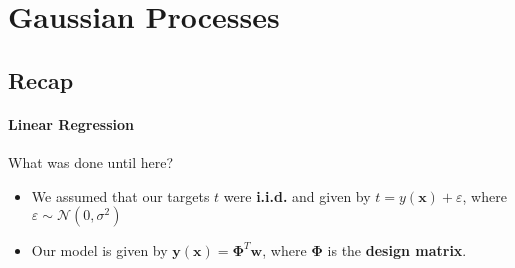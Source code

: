 \section{Gaussian Processes}
\framecard{\insertsection}

\subsection{Recap}
\begin{frame}{\insertsubsection}
    \framesubtitle{Linear Regression} 

    What was done until here?
    \begin{itemize}
        \item We assumed that our targets $t$ were \textcolor{UniOrange}{\textbf{i.i.d.}} and given by $t = y(\mathbf{x}) + \varepsilon$, where $\varepsilon \sim \mathcal{N}(0,\sigma^2)$
        \item Our model is given by $\mathbf{y}(\mathbf{x}) = \boldsymbol{\Phi}^T \mathbf{w}$, where $\boldsymbol{\Phi}$ is the \textcolor{UniOrange}{\textbf{design matrix}}.
    \end{itemize}


\end{frame}